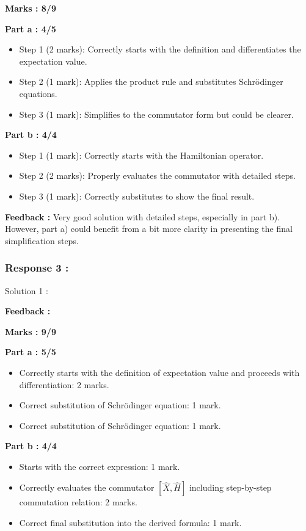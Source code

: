 \documentclass[a4paper,11pt]{article}
\begin{document}
\textbf{Marks : 8/9}

\textbf{Part a : 4/5}

\begin{itemize}
    \item Step 1 (2 marks): Correctly starts with the definition and differentiates the expectation value.
    \item Step 2 (1 mark): Applies the product rule and substitutes Schrödinger equations.
    \item Step 3 (1 mark): Simplifies to the commutator form but could be clearer.
\end{itemize}


\textbf{Part b : 4/4}

\begin{itemize}
    \item Step 1 (1 mark): Correctly starts with the Hamiltonian operator.
    \item Step 2 (2 marks): Properly evaluates the commutator with detailed steps.
    \item Step 3 (1 mark): Correctly substitutes to show the final result.
\end{itemize}

\textbf{Feedback :}
Very good solution with detailed steps, especially in part b). However, part a) could benefit from a bit more clarity in presenting the final simplification steps.



\subsubsection*{Response 3 :}

Solution 1 :

\textbf{Feedback :}

\textbf{Marks : 9/9}

\textbf{Part a : 5/5}

\begin{itemize}
    \item Correctly starts with the definition of expectation value and proceeds with differentiation: 2 marks.
    \item Correct substitution of Schrödinger equation: 1 mark.
    \item Correct substitution of Schrödinger equation: 1 mark.
\end{itemize}


\textbf{Part b : 4/4}

\begin{itemize}
    \item Starts with the correct expression: 1 mark.
    \item Correctly evaluates the commutator $[\hat{X}, \hat{H}]$ including step-by-step commutation relation: 2 marks.
    \item Correct final substitution into the derived formula: 1 mark.
\end{itemize}
\end{document}
